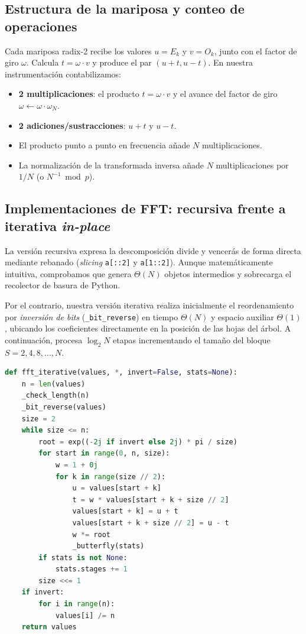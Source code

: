 \subsection{Estructura de la mariposa y conteo de operaciones}
Cada mariposa radix-2 recibe los valores $u = E_k$ y $v = O_k$, junto con el factor de giro $\omega$. Calcula $t = \omega \cdot v$ y produce el par $(u + t, u - t)$. En nuestra instrumentación contabilizamos:
\begin{itemize}
    \item \textbf{2 multiplicaciones}: el producto $t = \omega \cdot v$ y el avance del factor de giro $\omega \leftarrow \omega \cdot \omega_N$.
    \item \textbf{2 adiciones/sustracciones}: $u + t$ y $u - t$.
    \item El producto punto a punto en frecuencia añade $N$ multiplicaciones.
    \item La normalización de la transformada inversa añade $N$ multiplicaciones por $1/N$ (o $N^{-1} \bmod p$).
\end{itemize}

\subsection{Implementaciones de FFT: recursiva frente a iterativa \emph{in-place}}
La versión recursiva expresa la descomposición divide y vencerás de forma directa mediante rebanado (\emph{slicing} \texttt{a[::2]} y \texttt{a[1::2]}). Aunque matemáticamente intuitiva, comprobamos que genera $\Theta(N)$ objetos intermedios y sobrecarga el recolector de basura de Python.

Por el contrario, nuestra versión iterativa realiza inicialmente el reordenamiento por \emph{inversión de bits} (\texttt{\_bit\_reverse}) en tiempo $\Theta(N)$ y espacio auxiliar $\Theta(1)$, ubicando los coeficientes directamente en la posición de las hojas del árbol. A continuación, procesa $\log_2 N$ etapas incrementando el tamaño del bloque $S = 2, 4, 8, \dots, N$.
\begin{lstlisting}[language=Python,caption={Implementación iterativa in-place con inversión de bits}]
def fft_iterative(values, *, invert=False, stats=None):
    n = len(values)
    _check_length(n)
    _bit_reverse(values)
    size = 2
    while size <= n:
        root = exp((-2j if invert else 2j) * pi / size)
        for start in range(0, n, size):
            w = 1 + 0j
            for k in range(size // 2):
                u = values[start + k]
                t = w * values[start + k + size // 2]
                values[start + k] = u + t
                values[start + k + size // 2] = u - t
                w *= root
                _butterfly(stats)
        if stats is not None:
            stats.stages += 1
        size <<= 1
    if invert:
        for i in range(n):
            values[i] /= n
    return values
\end{lstlisting}

